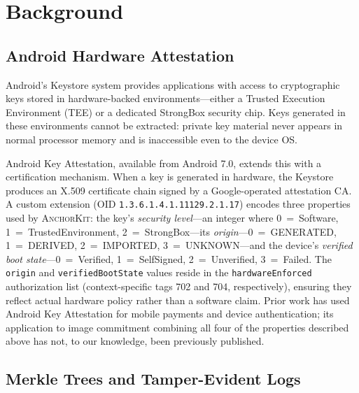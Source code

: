 \documentclass[11pt,a4paper]{article}
\newcommand{\AK}{\textsc{AnchorKit}\xspace}
\begin{document}
\section{Background}
\label{sec:background}

\subsection{Android Hardware Attestation}
\label{sec:background:attestation}

Android's Keystore system provides applications with access to cryptographic
keys stored in hardware-backed environments---either a Trusted Execution
Environment (TEE) or a dedicated StrongBox security chip.  Keys generated in
these environments cannot be extracted: private key material never appears in
normal processor memory and is inaccessible even to the device OS\@.

Android Key Attestation, available from Android 7.0, extends this with a
certification mechanism.  When a key is generated in hardware, the Keystore
produces an X.509 certificate chain signed by a Google-operated attestation CA\@.
A custom extension (OID \texttt{1.3.6.1.4.1.11129.2.1.17}) encodes three
properties used by \AK: the key's \emph{security level}---an integer
where 0~=~Software, 1~=~TrustedEnvironment, 2~=~StrongBox---its
\emph{origin}---0~=~GENERATED, 1~=~DERIVED, 2~=~IMPORTED,
3~=~UNKNOWN---and the device's \emph{verified boot state}---0~=~Verified,
1~=~SelfSigned, 2~=~Unverified, 3~=~Failed.  The \texttt{origin}
and \texttt{verifiedBootState} values reside in the
\texttt{hardwareEnforced} authorization list (context-specific tags 702
and 704, respectively), ensuring they reflect actual hardware policy rather
than a software claim.  Prior work has used
Android Key Attestation for mobile payments and device authentication; its
application to image commitment combining all four of the properties described
above has not, to our knowledge, been previously published.

\subsection{Merkle Trees and Tamper-Evident Logs}
\label{sec:background:merkle}
\end{document}
